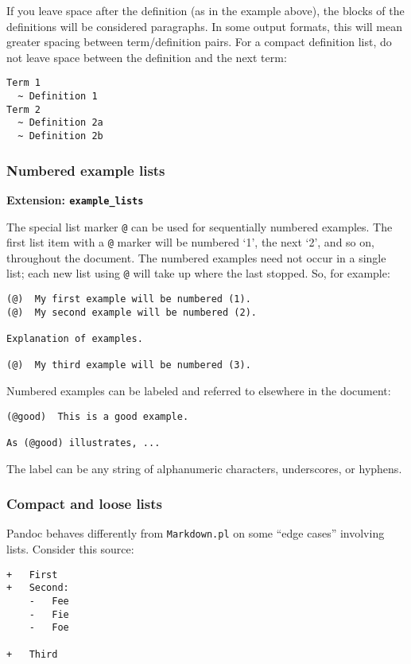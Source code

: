 \documentclass[]{article}
\begin{document}
If you leave space after the definition (as in the example above), the
blocks of the definitions will be considered paragraphs. In some output
formats, this will mean greater spacing between term/definition pairs.
For a compact definition list, do not leave space between the definition
and the next term:

\begin{verbatim}
Term 1
  ~ Definition 1
Term 2
  ~ Definition 2a
  ~ Definition 2b
\end{verbatim}

\subsubsection{Numbered example lists}

\textbf{Extension: \texttt{example\_lists}}

The special list marker \texttt{@} can be used for sequentially numbered
examples. The first list item with a \texttt{@} marker will be numbered
`1', the next `2', and so on, throughout the document. The numbered
examples need not occur in a single list; each new list using \texttt{@}
will take up where the last stopped. So, for example:

\begin{verbatim}
(@)  My first example will be numbered (1).
(@)  My second example will be numbered (2).

Explanation of examples.

(@)  My third example will be numbered (3).
\end{verbatim}

Numbered examples can be labeled and referred to elsewhere in the
document:

\begin{verbatim}
(@good)  This is a good example.

As (@good) illustrates, ...
\end{verbatim}

The label can be any string of alphanumeric characters, underscores, or
hyphens.

\subsubsection{Compact and loose lists}

Pandoc behaves differently from \texttt{Markdown.pl} on some ``edge
cases'' involving lists. Consider this source:

\begin{verbatim}
+   First
+   Second:
    -   Fee
    -   Fie
    -   Foe

+   Third
\end{verbatim}
\end{document}
